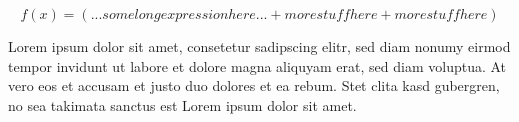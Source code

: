 \newcommand{\blah}{command definition
  goes here
  and here}

\begin{equation}
  f(x) = \left(... some long expression here ...
    + more stuff here
    + more stuff here \right)
\end{equation}

Lorem ipsum {\color{red} dolor sit amet, consetetur sadipscing elitr, sed diam
  nonumy eirmod tempor invidunt ut labore et dolore magna aliquyam erat, sed
  diam voluptua. At vero eos et accusam et justo duo dolores et ea rebum.} Stet
clita kasd gubergren, no sea takimata sanctus est Lorem ipsum dolor sit amet.
